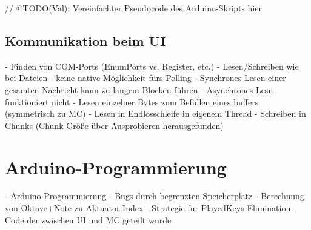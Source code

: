 \begin{UnbrokenCodePage}[style=CStyle, caption={Kommunikation beim \ac{MC}}, label={code:Comm-MC}]
// @TODO(Val): Vereinfachter Pseudocode des Arduino-Skripts hier
\end{UnbrokenCodePage}


\subsection{Kommunikation beim \ac{UI}} \label{umsetzungSW-Kommunikation-UI}
- Finden von COM-Ports (EnumPorts vs. Register, etc.) \newline
- Lesen/Schreiben wie bei Dateien \newline
- keine native Möglichkeit fürs Polling \newline
- Synchrones Lesen einer gesamten Nachricht kann zu langem Blocken führen \newline
- Asynchrones Lesn funktioniert nicht \newline
- Lesen einzelner Bytes zum Befüllen eines buffers (symmetrisch zu MC) \newline
- Lesen in Endlosschleife in eigenem Thread \newline
- Schreiben in Chunks (Chunk-Größe über Ausprobieren herausgefunden) \newline


\section{Arduino-Programmierung} \label{umsetzungSW-MC}

- Arduino-Programmierung \newline
	- Bugs durch begrenzten Speicherplatz \newline
	- Berechnung von Oktave+Note zu Aktuator-Index \newline
	- Strategie für PlayedKeys Elimination \newline
- Code der zwischen UI und MC geteilt wurde \newline

